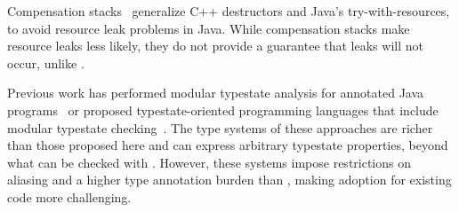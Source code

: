 Compensation stacks~\cite{WeimerN04} generalize C++ destructors and Java's
try-with-resources, to avoid resource leak problems in Java.  While
compensation stacks make resource leaks less likely, they do not provide a
guarantee that leaks will not occur, unlike \Tool.

Previous work has performed modular typestate analysis for annotated Java
programs~\cite{BierhoffA2007} or proposed typestate-oriented programming
languages that include modular typestate
checking~\cite{AldrichSSS2009,garcia2014typestate}.  The type systems of these
approaches are richer than those proposed here and can express arbitrary
typestate properties, beyond what can be checked with \Tool.
However, these systems impose restrictions on aliasing and a
higher type annotation burden than \Tool, making adoption for existing code
more challenging.






